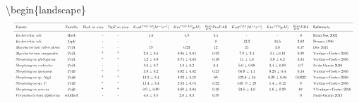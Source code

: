 \documentclass[12pt,twoside]{reedthesis}
\begin{document}
  \textbackslash{}begin\{landscape\}\\
  \[
  \resizebox{\columnwidth}{!}{%
  \begin{tabular}{ l c r c c c c c c c l}
  \hline \\ [-1.5ex]
  Fuente  &Familia & HisA $in\hspace{.1cm}vivo$ &TrpF $in\hspace{.1cm}vivo$ & $K{cat}^{ProFAR}[M^{-1}s^{-1}]$ & $Km^{ProFAR}[\mu M]$& $\frac{K{cat}}{Km} ProFAR$ & $K{cat}^{PRA}[M^{-1}s^{-1}]$ & $Km^{PRA}[\mu M]$  &  $\frac{Kcat}{Km} PRA $  &Referencia  \\ [1ex]
  \hline \\ [-1.5ex]  
  \textit{Escherichia} \textit{coli}         & HisA &- &- & 1.6 & 4.9 & 3.1 & -   & -   & 0   & Henn-Sax 2002 \\ [1ex]  
  \textit{Escherichia}  \textit{coli}        &TrpF  &- &- &-    &-    &0    & 12.2& 34.5& 2.82& Sterner 1996 \\ [1ex]    
  \textit{Mycobacterium} \textit{tuberculosis} &PriA&-&-&19&0.23&12&21&3.6&0.17& Due 2011\\ [1ex]    
  \textit{Mycobacterium}  \textit{smegmatis} &PriA&*&*& 2.6 ± 0.5 & 0.85 $ \pm $ 0.04 &0.33& 7.9 $ \pm $  2.4& 3.1 $ \pm $0.43  &0.39& Verduzco-Castro 2016 \\ [1ex]   
  \textit{Streptomyces} \textit{globisporus}  &PriA&*&*& 4.2 ± 0.8& 0.74 ± 0.03 &0.18& 11 ± 1.0 & 3.8 ± 0.2 &0.34& Verduzco-Castro 2016\\ [1ex]  
  \textit{Streptomyces} \textit{coelicolor} &PriA&-&-& 3.6 ± 0.7 & 1.3 ± 0.2 &0.4& 5.0 ± 0.08 & 3.4 ± 0.09 &0.7& Noda-Garcia 2010\\ [1ex]   
  \textit{Streptomyces} \textit{ipomoeae}  &PriB&*&*& 3.8 ± 0.2 & 0.82 ± 0.02 &0.21& 60.8 ± 1.1&  8.25 ± 0.4&0.14& Verduzco-Castro 2016\\ [1ex]   
  \textit{Streptomyces} sp. Mg1  &PriB&*&*& 13.2 ± 3.4 &0.92 ± 0.19 &69&129.6 ± 34 &0.29 ± 0.04&0.0022&Verduzco-Castro 2016\\ [1ex]  
  \textit{Streptomyces} sp. C&PriB&*&*&11.4 ± 3.4 &2.53 ± 0.74 &0.22&149. 9 ± 29& 1.4 ± 0.12 &9&Verduzco-Castro 2016\\ [1ex]    
  \textit{Streptomyces} \textit{sviceus} &PriB&*&*&3.9 ± 0.89 &0.69 ± 0.04 &0.18&24.5 ± 4.0& 1.6 ± 0.29 &67&VVerduzco-Castro 2016\\ [1ex]   
  \textit{Corynebacterium} \textit{diphteriae} &subHisA&-&-&4.4 ± 0.5&2.6 ± 0.3&0.59&&&0& Noda-Garcia 2013\\ [1ex]    

\end{tabular}}\]
\end{document}

